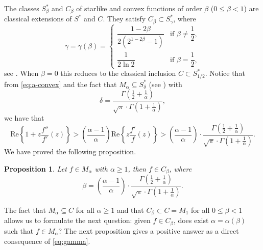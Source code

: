 \documentclass[reqno]{amsart}
\theoremstyle{plain}
\newtheorem{prop}[theo]{Proposition}
\theoremstyle{definition}
\begin{document}
The classes $S^*_\beta$ and $C_\beta$ of starlike and convex functions of order $\beta$ ($0 \leq \beta < 1$) are classical extensions of $S^*$ and $C$. They satisfy $C_\beta \subset S^*_\gamma$, where
\begin{equation}\label{eq:gamma}
\gamma = \gamma(\beta) = \begin{cases}
\dfrac{1-2\beta}{2(2^{1-2\beta}-1)} & \text{if } \beta \neq \dfrac{1}{2}, \\[6pt]
\dfrac{1}{2\ln 2} & \text{if } \beta = \dfrac{1}{2},
\end{cases}
\end{equation}
see \cite{MM2000,GK2003}. When $\beta = 0$ this reduces to the classical inclusion $C \subset S^*_{1/2}$. Notice that from \eqref{eq:a-convex} and the fact that
\( M_\alpha\subseteq S^*_\delta \) (see \cite{MMR1978}) with
\[\delta=\dfrac{\Gamma\left(\frac{1}{2}+\frac{1}{\alpha}\right)}{\sqrt{\pi}\cdot\Gamma\left(1+\frac{1}{\alpha}\right)},\]
we have that
\begin{equation*}
    \text{Re}\left\{1+z\dfrac{f''}{f'}(z)\right\}>\left(\dfrac{\alpha-1}{\alpha}\right)\text{Re}\left\{z\dfrac{f'}{f}(z)\right\}>\left(\dfrac{\alpha-1}{\alpha}\right)\cdot \dfrac{\Gamma\left(\frac{1}{2}+\frac{1}{\alpha}\right)}{\sqrt{\pi}\cdot\Gamma\left(1+\frac{1}{\alpha}\right)}.
\end{equation*}
We have proved the following proposition.
\begin{prop}\label{prop_beta}
    Let $f\in M_\alpha$ with $\alpha\geq 1$, then $f\in C_{\beta}$, where
    \begin{equation*}
     \beta=\left(\dfrac{\alpha-1}{\alpha}\right)\cdot \dfrac{\Gamma\left(\frac{1}{2}+\frac{1}{\alpha}\right)}{\sqrt{\pi}\cdot\Gamma\left(1+\frac{1}{\alpha}\right)}.
    \end{equation*}
\end{prop}
The fact that \( M_\alpha \subseteq C \) for all \( \alpha\geq 1\) and that \( C_\beta\subset C=M_1 \) for all \( 0\leq \beta<1 \) allows us to formulate the next question: given \( f\in C_\beta \), does exist \( \alpha=\alpha(\beta) \) such that \( f\in M_\alpha\)? The next proposition gives a positive answer as a direct consequence of \eqref{eq:gamma}.
\end{document}
